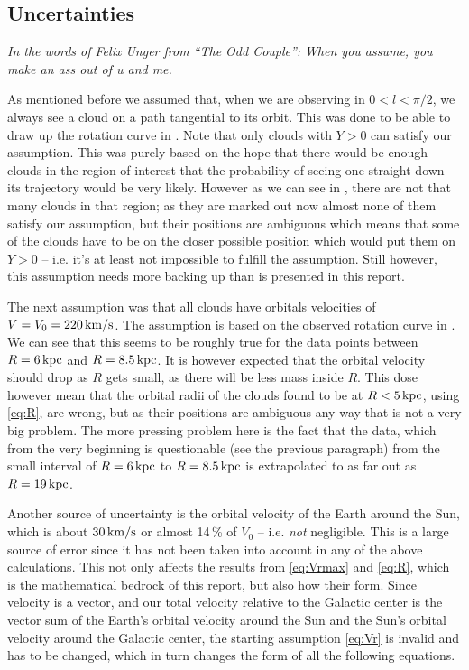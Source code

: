 \documentclass[11pt,a4paper, twocolumn,
swedish, english %
]{article}
\begin{document}
\subsection{Uncertainties}
\textsl{In the words of Felix Unger from ``The Odd Couple'':}
\textit{When you assume, you make an ass out of u and me.}

As mentioned before we assumed that, when we are observing in
$0<l<\pi/2$, we always see a cloud on a path tangential to its
orbit. This was done to be able to draw up the rotation curve in
. Note that only clouds with $Y>0$ can satisfy our
assumption. 
This was purely based on the hope that there would
be enough clouds in the region of interest that the probability of
seeing one straight down its trajectory would be very likely.
However as we can see in , there are not that many
clouds in that region; as they are marked out now almost none of them
satisfy our assumption, but their positions are ambiguous which means
that some of the clouds have to be on the closer possible position
which would put them on $Y>0$ -- i.e. it's at least not impossible to
fulfill the assumption. Still however, this assumption needs more
backing up than is presented in this report. 

The next assumption was that all clouds have orbitals velocities of
$V=V_0=\unit[220]{km/s}$. The assumption is based on the observed
rotation curve in . We can see that this seems to be
roughly true for the data points between $R=\unit[6]{kpc}$ and
$R=\unit[8.5]{kpc}$. It is however expected that the orbital velocity
should drop as $R$ gets small, as there will be less mass inside
$R$. This dose however mean that the orbital radii of the clouds found
to be at $R<\unit[5]{kpc}$, using \eqref{eq:R}, are wrong, but as
their positions are ambiguous any way that is not a very big
problem. The more pressing problem here is the fact that the data,
which from the very beginning is questionable (see the previous
paragraph) from the small interval of $R=\unit[6]{kpc}$ to
$R=\unit[8.5]{kpc}$ is extrapolated to as far out as
$R=\unit[19]{kpc}$.

Another source of uncertainty is the orbital velocity of the Earth
around the Sun, which is about $\unit[30]{km/s}$ or almost 14\,\% of
$V_0$ -- i.e. \emph{not} negligible. This is a large source of error
since it has not been taken into account in any of the above
calculations. This not only affects the results from \eqref{eq:Vrmax}
and \eqref{eq:R}, which is the mathematical bedrock of this report,
but also how their form. Since velocity is a vector, and our total
velocity relative to the Galactic center is the vector sum of the
Earth's orbital velocity around the Sun and the Sun's orbital velocity
around the Galactic center, the starting assumption \eqref{eq:Vr} is
invalid and has to be changed, which in turn changes the form of all
the following equations.
\end{document}
